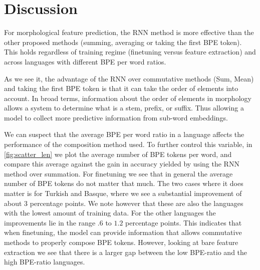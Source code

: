\documentclass[11pt]{article}
\newcommand\adam[1]{(\textbf{Adam:} #1)}
\begin{document}
	
	
	\section{Discussion}

        For morphological feature prediction, the RNN method is more
     effective than the other proposed methods (summing, averaging or
     taking the first BPE token). This holds regardless of training
     regime (finetuning versus feature extraction) and across
     languages with different BPE per word ratios.
    
                 As we see it, the advantage of the RNN over
     commutative methods (Sum, Mean) and taking the first BPE token is
     that it can take the order of elements into account. In broad
     terms, information about the order of elements in morphology
     allows a system to determine what is a stem, prefix, or suffix.
      Thus allowing a model to collect more predictive information
     from sub-word embeddings.

             We can suspect that the average BPE per word ratio in a
     language affects the performance of the composition method
     used. To further control this variable, in \cref{fig:scatter_len}
     we plot the average number of BPE tokens per word, and compare
     this average against the gain in accuracy yielded by using the
     RNN method over summation.  For finetuning we see that in
     general the average number of BPE tokens do not matter that
     much. The two cases where it does matter is for Turkish and
     Basque, where we see a substantial improvement of about $3$
     percentage points. We note however that these are also the
     languages with the lowest amount of training data.
        For the other languages the improvements lie in the range $.6$
     to $1.2$ percentage points. This indicates that when finetuning,
     the model can provide information that allows commutative methods
     to properly compose BPE tokens. However, looking at bare feature
     extraction we see that there is a larger gap between the low
     BPE-ratio and the high BPE-ratio languages.
\end{document}
